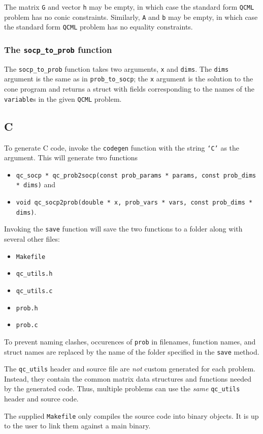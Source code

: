 \documentclass[11pt]{article}
\def\qcml{\texttt{QCML}\xspace}
\begin{document}
The matrix {\tt G} and vector {\tt h} may be empty, in which case the
standard form \qcml problem has no conic constraints. Similarly, {\tt A} and
{\tt b} may be empty, in which case the standard form \qcml problem has no
equality constraints.

\subsubsection{The {\tt socp\_to\_prob} function}
The {\tt socp\_to\_prob} function takes two arguments, {\tt x} and {\tt dims}.
The {\tt dims} argument is the same as in {\tt prob\_to\_socp}; the {\tt x}
argument is
the solution to the cone program and returns a struct with fields
corresponding to the names of the {\tt variable}s in the given \qcml problem.

\subsection{C}
To generate C code, invoke the {\tt codegen} function with the string
{\tt `C'} as the argument. This will generate two functions
\begin{itemize}
\item {\tt qc\_socp * qc\_prob2socp(const prob\_params * params, const prob\_dims * dims)} and
\item {\tt void qc\_socp2prob(double * x, prob\_vars * vars, const prob\_dims * dims)}.
\end{itemize}
Invoking the {\tt save} function will save the two functions to a folder along
with several other files:
\begin{itemize}
  \item {\tt Makefile}
  \item {\tt qc\_utils.h}
  \item {\tt qc\_utils.c}
  \item {\tt prob.h}
  \item {\tt prob.c}
\end{itemize}
To prevent naming clashes, occurences of {\tt prob} in filenames, function
names, and struct names are replaced by the name of the folder specified in
the {\tt save} method.

The {\tt qc\_utils} header and source file are \emph{not} custom generated
for each problem. Instead, they
contain the common matrix data structures and functions needed by the
generated code. Thus, multiple problems can use the \emph{same} {\tt qc\_utils} header
and source code.

The supplied {\tt Makefile} only compiles the source code into binary objects.
It is up to the user to link them against a main binary.
\end{document}
